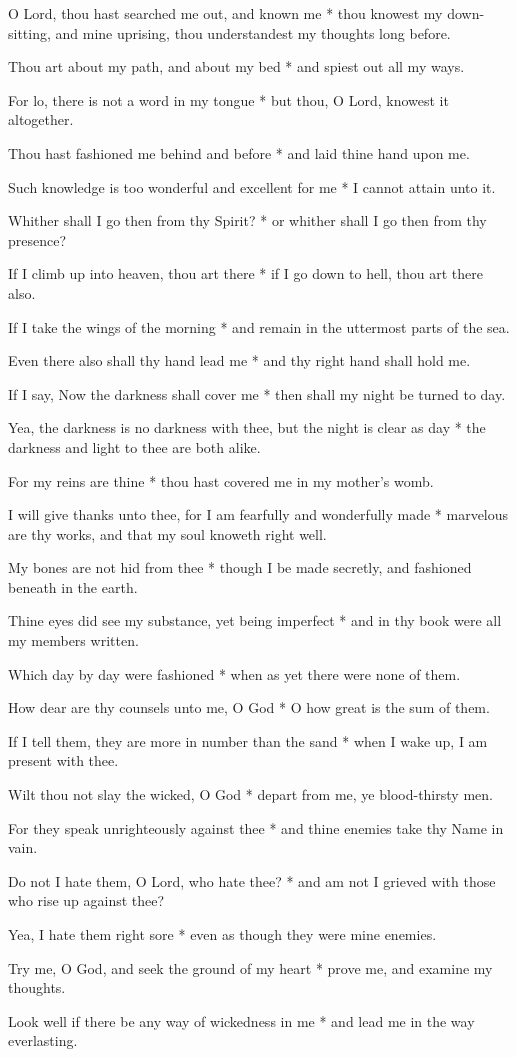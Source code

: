 O Lord, thou hast searched me out, and known me * thou knowest my down-sitting, and mine uprising, thou understandest my thoughts long before.

Thou art about my path, and about my bed * and spiest out all my ways.

For lo, there is not a word in my tongue * but thou, O Lord, knowest it altogether.

Thou hast fashioned me behind and before * and laid thine hand upon me.

Such knowledge is too wonderful and excellent for me * I cannot attain unto it.

Whither shall I go then from thy Spirit? * or whither shall I go then from thy presence?

If I climb up into heaven, thou art there * if I go down to hell, thou art there also.

If I take the wings of the morning * and remain in the uttermost parts of the sea.

Even there also shall thy hand lead me * and thy right hand shall hold me.

If I say, Now the darkness shall cover me * then shall my night be turned to day.

Yea, the darkness is no darkness with thee, but the night is clear as day * the darkness and light to thee are both alike.

For my reins are thine * thou hast covered me in my mother's womb.

I will give thanks unto thee, for I am fearfully and wonderfully made * marvelous are thy works, and that my soul knoweth right well.

My bones are not hid from thee * though I be made secretly, and fashioned beneath in the earth.

Thine eyes did see my substance, yet being imperfect * and in thy book were all my members written.

Which day by day were fashioned * when as yet there were none of them.

How dear are thy counsels unto me, O God * O how great is the sum of them.

If I tell them, they are more in number than the sand * when I wake up, I am present with thee.

Wilt thou not slay the wicked, O God * depart from me, ye blood-thirsty men.

For they speak unrighteously against thee * and thine enemies take thy Name in vain.

Do not I hate them, O Lord, who hate thee? * and am not I grieved with those who rise up against thee?

Yea, I hate them right sore * even as though they were mine enemies.

Try me, O God, and seek the ground of my heart * prove me, and examine my thoughts.

Look well if there be any way of wickedness in me * and lead me in the way everlasting.